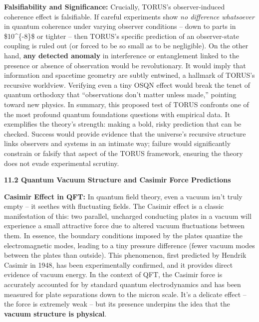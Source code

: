 \documentclass[
]{article}
\begin{document}
\textbf{Falsifiability and Significance:} Crucially, TORUS's
observer-induced coherence effect is falsifiable. If careful experiments
show \emph{no difference whatsoever} in quantum coherence under varying
observer conditions -- down to parts in \$10\^{}\{-8\}\$ or tighter --
then TORUS's specific prediction of an observer-state coupling is ruled
out (or forced to be so small as to be negligible)\hspace{0pt}. On the
other hand, \textbf{any detected anomaly} in interference or
entanglement linked to the presence or absence of observation would be
revolutionary. It would imply that information and spacetime geometry
are subtly entwined, a hallmark of TORUS's recursive
worldview\hspace{0pt}. Verifying even a tiny OSQN effect would break the
tenet of quantum orthodoxy that ``observations don't matter unless
made,'' pointing toward new physics. In summary, this proposed test of
TORUS confronts one of the most profound quantum foundations questions
with empirical data. It exemplifies the theory's strength: making a
bold, risky prediction that can be checked. Success would provide
evidence that the universe's recursive structure links observers and
systems in an intimate way; failure would significantly constrain or
falsify that aspect of the TORUS framework, ensuring the theory does not
evade experimental scrutiny.

\textbf{11.2 Quantum Vacuum Structure and Casimir Force Predictions}

\textbf{Casimir Effect in QFT:} In quantum field theory, even a vacuum
isn't truly empty -- it seethes with fluctuating fields. The Casimir
effect is a classic manifestation of this: two parallel, uncharged
conducting plates in a vacuum will experience a small attractive force
due to altered vacuum fluctuations between them\hspace{0pt}. In essence,
the boundary conditions imposed by the plates quantize the
electromagnetic modes, leading to a tiny pressure difference (fewer
vacuum modes between the plates than outside)\hspace{0pt}. This
phenomenon, first predicted by Hendrik Casimir in 1948, has been
experimentally confirmed, and it provides direct evidence of vacuum
energy. In the context of QFT, the Casimir force is accurately accounted
for by standard quantum electrodynamics and has been measured for plate
separations down to the micron scale. It's a delicate effect -- the
force is extremely weak -- but its presence underpins the idea that the
\textbf{vacuum structure is physical}.
\end{document}
